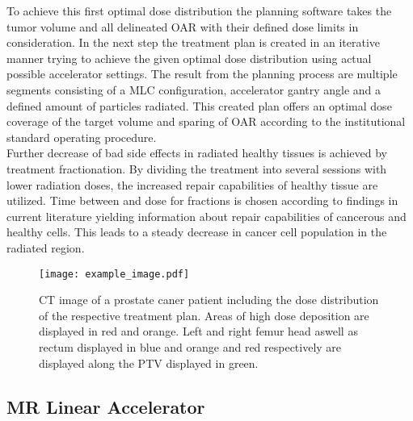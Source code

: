To achieve this first optimal dose distribution the planning software takes the tumor volume and all delineated \acs{OAR} with their defined dose limits in consideration.
In the next step the treatment plan is created in an iterative manner trying to achieve the given optimal dose distribution using actual possible accelerator settings.
The result from the planning process are multiple segments consisting of a \ac{MLC} configuration, accelerator gantry angle and a defined amount of particles radiated.
This created plan offers an optimal dose coverage of the target volume and sparing of \ac{OAR} according to the institutional standard operating procedure.\\
Further decrease of bad side effects in radiated healthy tissues is achieved by treatment fractionation.
By dividing the treatment into several sessions with lower radiation doses, the increased repair capabilities of healthy tissue are utilized.
Time between and dose for fractions is chosen according to findings in current literature yielding information about repair capabilities of cancerous and healthy cells.
This leads to a steady decrease in cancer cell population in the radiated region.

\begin{figure}
    \centering
    \texttt{[image: example\_image.pdf]}
    \caption{
        CT image of a prostate caner patient including the dose distribution of the respective treatment plan. Areas of high dose deposition are displayed in red and orange. Left and right femur head aswell as rectum displayed in blue and orange and red respectively are displayed along the \acs{PTV} displayed in green.
        }\label{fig:prostate_oar}
\end{figure}

\subsection{MR Linear Accelerator}

